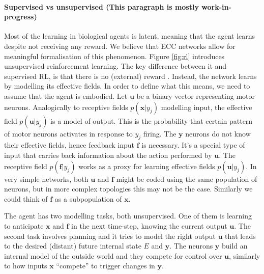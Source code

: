 \documentclass[12pt]{article}
\begin{document}
\paragraph{Supervised vs unsupervised (This paragraph is mostly work-in-progress)}
Most of the learning in biological agents is latent, meaning that the agent learns despite not receiving any reward. We believe that ECC networks allow for meaningful formalisation of this phenomenon. Figure \ref{fig:rl} introduces unsupervised reinforcement learning. The key difference between it and supervised RL, is that there is no (external) reward . Instead, the network learns by modelling its effective fields. In order to define what this means, we need to assume that the agent is embodied. Let $\boldsymbol{u}$ be a binary vector representing motor neurons.
Analogically to receptive fields $p(\boldsymbol{x}|y_j)$ modelling input, the effective field
$p(\boldsymbol{u}|y_j)$ is a model of output. This is the probability that certain pattern of motor neurons activates in response to $y_j$ firing. The $\boldsymbol{y}$ neurons do not know their effective fields, hence feedback input $\boldsymbol{f}$ is necessary. It's a special type of input that carries back information about the action performed by $\boldsymbol{u}$. The receptive field $p(\boldsymbol{f}|y_j)$ works as a proxy for learning effective fields $p(\boldsymbol{u}|y_j)$. In very simple networks, both $\boldsymbol{u}$ and $\boldsymbol{f}$ might be coded using the same population of neurons, but in more complex topologies this may not be the case. Similarly we could think of $\boldsymbol{f}$ as a subpopulation of $\boldsymbol{x}$. 

The agent has two modelling tasks, both unsupervised. One of them is learning to anticipate $\boldsymbol{x}$ and $\boldsymbol{f}$ in the next time-step, knowing the current output $\boldsymbol{u}$. The second task involves planning and it tries to model the right output $\boldsymbol{u}$ that leads to the desired (distant) future internal state $E$ and $\boldsymbol{y}$. The neurons $\boldsymbol{y}$ build an internal model of the outside world and they compete for control over $\boldsymbol{u}$, similarly to how inputs $\boldsymbol{x}$ ``compete'' to trigger changes in $\boldsymbol{y}$.
\end{document}
